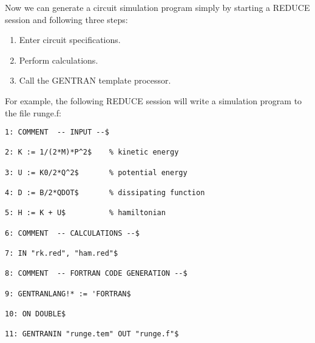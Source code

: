 
Now we can generate a circuit simulation program simply by starting
a REDUCE session and following three steps:
\begin{enumerate}
\item Enter circuit specifications.
\item Perform calculations.
\item Call the GENTRAN template processor.
\end{enumerate}
For example, the following REDUCE session will write a simulation
program to the file runge.f:
\begin{verbatim}
1: COMMENT  -- INPUT --$ 

2: K := 1/(2*M)*P^2$    % kinetic energy 

3: U := K0/2*Q^2$       % potential energy 

4: D := B/2*QDOT$       % dissipating function 

5: H := K + U$          % hamiltonian 

6: COMMENT  -- CALCULATIONS --$ 

7: IN "rk.red", "ham.red"$ 

8: COMMENT  -- FORTRAN CODE GENERATION --$ 

9: GENTRANLANG!* := 'FORTRAN$ 

10: ON DOUBLE$

11: GENTRANIN "runge.tem" OUT "runge.f"$ 
\end{verbatim}

